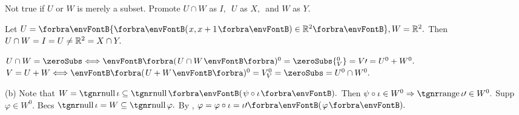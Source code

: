 \AComm Not true if $U$ or $W$ is merely a subset. Promote $U\cap W$ as $I,$ \,$U$ as $X,$ \,and $W$ as $Y.$\par
\AExa Let $U=\Bra{\Par{x,x+1}\in\Rbb^2},W=\Rbb^2.$ Then $U\cap W=I=U\neq{\mathbb{R}}^2=X\cap Y.$
\SepLine
\pagebreak

$U\cap W=\zeroSubs\Longleftrightarrow \BigPar{U\cap W}{^0}=\zeroSubs{_V^0}=V\apostrophe=U^0+W^0.$\parSol{\vspace{1pt}}
$V=U+W\Longleftrightarrow\BigPar{U+W}{^0}=V_V^0=\zeroSubs=U^0\cap W^0.$\PfEnd
\SepLine

(b) \Or Note that $W=\null{\iota}\subseteq\null\Par{\psi\circ\iota}.$ Then $\psi\circ\iota\in W^0\Rightarrow\range\iota\apostrophe\in W^0.$\parSol{\Hb}
\Blind{\Or}Supp $\varphi\in W^0.$ Becs $\null\iota=W\subseteq\null\varphi.$ By , $\varphi=\varphi\circ\iota=\iota\apostrophe\Par{\varphi}.$\PfEnd
\SepLine


